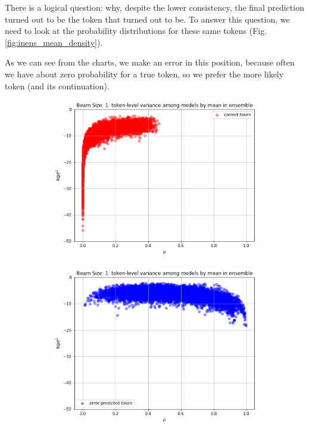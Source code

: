 \documentclass[a4paper,14pt]{extarticle}
\begin{document}
	There is a logical question: why, despite the lower consistency, the final prediction turned out to be the token that turned out to be. To answer this question, we need to look at the probability distributions for these same tokens (Fig. \ref{fig:inens_mean_density}).
	
	As we can see from the charts, we make an error in this position, because often we have about zero probability for a true token, so we prefer the more likely token (and its continuation).
	
	\begin{figure}[t]
		\begin{subfigure}{.5\textwidth}
			\includegraphics[width=\textwidth]{images/inens_scatter_correct.png}
		\end{subfigure}
		\begin{subfigure}{.5\textwidth}
			\includegraphics[width=\textwidth]{images/inens_scatter_error.png}
		\end{subfigure}
	\end{figure}
	
\end{document}
